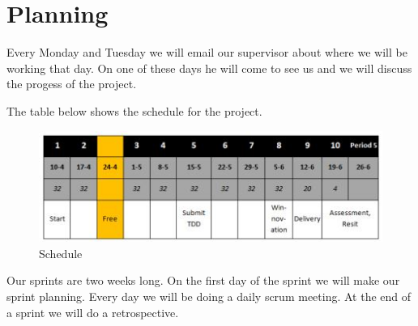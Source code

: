 \section{Planning}
Every Monday and Tuesday we will email our supervisor about where we will be working that day. On one of these days he will come to see us and we will discuss the progess of the project. 

The table below shows the schedule for the project.
\begin{figure}[!htb]
    \centering
    \includegraphics[scale=1.25]{images/schedule.jpg}
    \caption{Schedule}\label{fig:fuzzy-distance}
\end{figure}

Our sprints are two weeks long. On the first day of the sprint we will make our sprint planning. Every day we will be doing a daily scrum meeting. At the end of a sprint we will do a retrospective.

